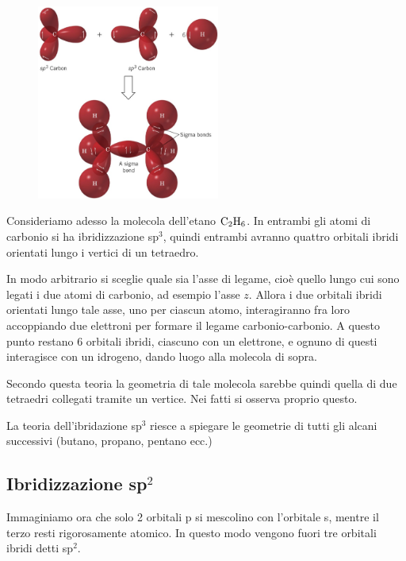 \vspace{-0.6cm}\hspace{0.5cm}\begin{minipage}{0.2\textwidth}
    \begin{figure}[H]
        \includegraphics[width=6cm]{immagini/etano.png}
    \end{figure}
\end{minipage} \hfill
\begin{minipage}{0.5\textwidth}
    \vspace{1cm}Consideriamo adesso la molecola dell'etano $\rm C_2H_6$. In entrambi gli atomi di carbonio si ha ibridizzazione sp$^3$, quindi entrambi avranno quattro orbitali ibridi orientati lungo i vertici di un tetraedro.

    In modo arbitrario si sceglie quale sia l'asse di legame, cioè quello lungo cui sono legati i due atomi di carbonio, ad esempio l'asse $z$. Allora i due orbitali ibridi orientati lungo tale asse, uno per ciascun atomo, interagiranno fra loro accoppiando due elettroni per formare il legame carbonio-carbonio. A questo punto restano 6 orbitali ibridi, ciascuno con un elettrone, e ognuno di questi interagisce con un idrogeno, dando luogo alla molecola di sopra.
    
    Secondo questa teoria la geometria di tale molecola sarebbe quindi quella di due tetraedri collegati tramite un vertice. Nei fatti si osserva proprio questo.
\end{minipage}

\vspace{0.2cm}La teoria dell'ibridazione sp$^3$ riesce a spiegare le geometrie di tutti gli alcani successivi (butano, propano, pentano ecc.)

\subsection{Ibridizzazione sp$^2$}
Immaginiamo ora che solo 2 orbitali p si mescolino con l'orbitale s, mentre il terzo resti rigorosamente atomico. In questo modo vengono fuori tre orbitali ibridi detti sp$^2$.

